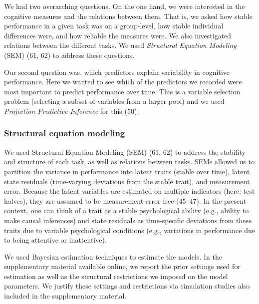 \documentclass[
  man,floatsintext]{apa6}
\begin{document}
We had two overarching questions. On the one hand, we were interested in the cognitive measures and the relations between them. That is, we asked how stable performance in a given task was on a group-level, how stable individual differences were, and how reliable the measures were. We also investigated relations between the different tasks. We used \emph{Structural Equation Modeling} (SEM) (61, 62) to address these questions.

Our second question was, which predictors explain variability in cognitive performance. Here we wanted to see which of the predictors we recorded were most important to predict performance over time. This is a variable selection problem (selecting a subset of variables from a larger pool) and we used \emph{Projection Predictive Inference} for this (50).

\hypertarget{structural-equation-modeling}{%
\subsubsection{Structural equation modeling}\label{structural-equation-modeling}}

We used Structural Equation Modeling (SEM) (61, 62) to address the stability and structure of each task, as well as relations between tasks. SEMs allowed us to partition the variance in performance into latent traits (stable over time), latent state residuals (time-varying deviations from the stable trait), and measurement error. Because the latent variables are estimated on multiple indicators (here: test halves), they are assumed to be measurement-error-free (45--47). In the present context, one can think of a trait as a stable psychological ability (e.g., ability to make causal inferences) and state residuals as time-specific deviations from these traits due to variable psychological conditions (e.g., variations in performance due to being attentive or inattentive).

We used Bayesian estimation techniques to estimate the models. In the supplementary material available online, we report the prior settings used for estimation as well as the structural restrictions we imposed on the model parameters. We justify these settings and restrictions via simulation studies also included in the supplementary material.
\end{document}
